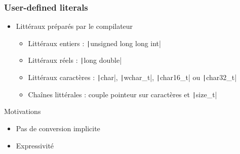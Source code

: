 \documentclass[C++.tex]{subfiles}
\begin{document}
\begin{frame}[fragile]
	\frametitle{User-defined literals}
	\begin{itemize}
		\item Littéraux préparés par le compilateur
		\begin{itemize}
			\item Littéraux entiers : \texttt|unsigned long long int|
			\item Littéraux réels : \texttt|long double|
			\item Littéraux caractères : \texttt|char|, \texttt|wchar_t|, \texttt|char16_t| ou \texttt|char32_t|
			\item Chaînes littérales : couple pointeur sur caractères et \texttt|size_t|
		\end{itemize}
	\end{itemize}

	\begin{block}{Motivations}
		\begin{itemize}
			\item Pas de conversion implicite
			\item Expressivité

		\end{itemize}
	\end{block}


\end{frame}
\end{document}
